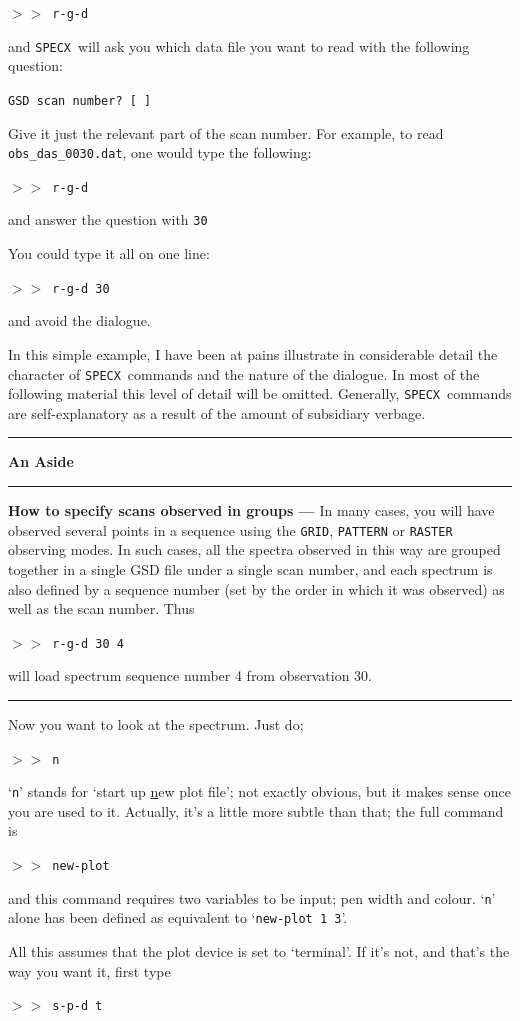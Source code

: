 \documentclass[11pt,twoside]{article}
\newcommand{\SPECX}{{\tt SPECX}}
\newcommand{\SP}{{$>\!>$}}
\newcommand{\aside}
{\begin{center}\rule[1mm]{1.0in}{0.015in}\hspace*{2mm}
{\bf An Aside}
\hspace*{2mm}\rule[1mm]{1.0in}{0.015in}\end{center}\vspace*{-0.2in}}
\newcommand{\myline}
{\vspace*{-0.2in}\begin{center}\rule{3.0in}{0.015in}\end{center}}
\begin{document}
\SP\ {\tt r-g-d}

and \SPECX\ will ask you which data file you want to read with the
following question:

{\tt GSD scan number? [ ]}

Give it just the relevant part of the scan number.  For example, to
read {\tt obs\_das\_0030.dat}, one would type the following:

\SP\ {\tt r-g-d}

and answer the question with {\tt 30}

You could type it all on one line:

\SP\ {\tt r-g-d 30}

and avoid the dialogue.

In this simple example, I have been at pains illustrate in
considerable detail the character of \SPECX\ commands and the nature
of the dialogue. In most of the following material this level of
detail will be omitted. Generally, \SPECX\ commands are
self-explanatory as a result of the amount of subsidiary verbage.

\aside
{\bf How to specify scans observed in groups --- } In many cases, you
will have observed several points in a sequence using the {\tt GRID},
{\tt PATTERN} or {\tt RASTER} observing modes. In such cases, all the
spectra observed in this way are grouped together in a single GSD file
under a single scan number, and each spectrum is also defined by a
sequence number (set by the order in which it was observed) as well as
the scan number.  Thus

\SP\ {\tt r-g-d 30 4}

will load spectrum sequence number 4 from observation 30.
\myline

Now you want to look at the spectrum.  Just do;

\SP\ {\tt n}

`{\tt{n}}' stands for `start up \underline{n}ew plot file'; not exactly
obvious, but it makes sense once you are used to it. Actually, it's a
little more subtle than that; the full command is

\SP\ {\tt new-plot} 

and this command requires two variables to be input; pen width and
colour. `{\tt{n}}' alone has been defined as equivalent to
`{\tt{new-plot 1 3}}'.

All this assumes that the plot device is set to `terminal'. If it's not,
and that's the way you want it, first type

\SP\ {\tt s-p-d t}
\end{document}
